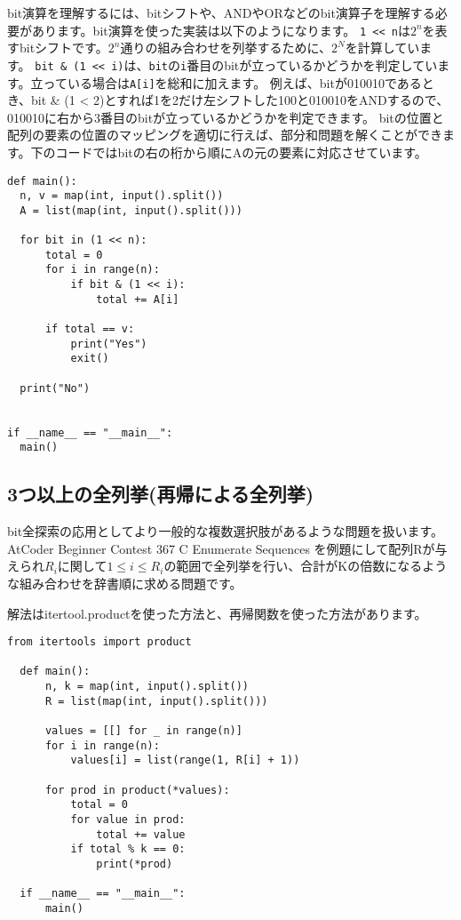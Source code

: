 bit演算を理解するには、bitシフトや、ANDやORなどのbit演算子を理解する必要があります。bit演算を使った実装は以下のようになります。
\texttt{1 << n}は$2^n$を表すbitシフトです。$2^n$通りの組み合わせを列挙するために、$2^N$を計算しています。
\texttt{bit \& (1 << i)}は、\texttt{bit}の\texttt{i}番目のbitが立っているかどうかを判定しています。立っている場合は\texttt{A[i]}を総和に加えます。
例えば、bitが010010であるとき、bit \& (1 < 2)とすれば1を2だけ左シフトした100と010010をANDするので、010010に右から3番目のbitが立っているかどうかを判定できます。
bitの位置と配列の要素の位置のマッピングを適切に行えば、部分和問題を解くことができます。下のコードではbitの右の桁から順にAの元の要素に対応させています。

\begin{lstlisting}[caption=bit演算を使ったbit全探索, label=bit_search, frame=TRBL]
def main():
  n, v = map(int, input().split())
  A = list(map(int, input().split()))
  
  for bit in (1 << n):
      total = 0
      for i in range(n):
          if bit & (1 << i):
              total += A[i]
      
      if total == v:
          print("Yes")
          exit()
  
  print("No")
              

if __name__ == "__main__":
  main()
\end{lstlisting}

\subsection{3つ以上の全列挙(再帰による全列挙)}
bit全探索の応用としてより一般的な複数選択肢があるような問題を扱います。AtCoder Beginner Contest 367 C Enumerate Sequences
を例題にして配列Rが与えられ$R_i$に関して$1 \leq i \leq R_i$の範囲で全列挙を行い、合計がKの倍数になるような組み合わせを辞書順に求める問題です。

解法はitertool.productを使った方法と、再帰関数を使った方法があります。

\begin{lstlisting}[caption=itertools.productを使った解法, label=product_ans, frame=TRBL]
from itertools import product

  def main():
      n, k = map(int, input().split())
      R = list(map(int, input().split()))
      
      values = [[] for _ in range(n)]
      for i in range(n):
          values[i] = list(range(1, R[i] + 1))
      
      for prod in product(*values):
          total = 0
          for value in prod:
              total += value
          if total % k == 0:
              print(*prod)
  
  if __name__ == "__main__":
      main()
\end{lstlisting}



